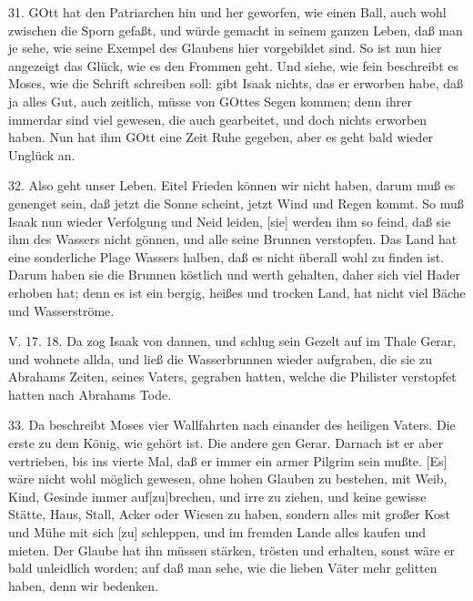 31. GOtt hat den Patriarchen hin und her geworfen, wie einen Ball, auch wohl zwischen die Sporn gefaßt, und würde gemacht in seinem ganzen Leben, daß man je sehe, wie seine Exempel des Glaubens hier vorgebildet sind. So ist nun hier angezeigt das Glück, wie es den Frommen geht. Und siehe, wie fein beschreibt es Moses, wie die Schrift schreiben soll: gibt Isaak nichts, das er erworben habe, daß ja alles Gut, auch zeitlich, müsse von GOttes Segen kommen; denn ihrer immerdar sind viel gewesen, die auch gearbeitet, und doch nichts erworben haben. Nun hat ihm GOtt eine Zeit Ruhe gegeben, aber es geht bald wieder Unglück an.

32. Also geht unser Leben. Eitel Frieden können wir nicht haben, darum muß es genenget sein, daß jetzt die Sonne scheint, jetzt Wind und Regen kommt. So muß Isaak nun wieder Verfolgung und Neid leiden, [sie] werden ihm so feind, daß sie ihm des Wassers nicht gönnen, und alle seine Brunnen verstopfen. Das Land
hat eine sonderliche Plage Wassers halben, daß es nicht überall wohl zu finden ist. Darum haben sie die Brunnen köstlich und werth gehalten, daher sich viel Hader erhoben hat; denn es ist ein bergig, heißes und trocken Land, hat nicht viel Bäche und Wasserströme.

\begin{schriftzitat}
V. 17. 18. Da zog Isaak von dannen, und schlug sein Gezelt auf im Thale Gerar, und wohnete allda, und ließ die Wasserbrunnen wieder aufgraben, die sie zu Abrahams Zeiten, seines Vaters, gegraben hatten, welche die Philister verstopfet hatten nach Abrahams Tode.
\end{schriftzitat}

33. Da beschreibt Moses vier Wallfahrten nach einander des heiligen Vaters. Die erste zu dem König, wie gehört ist. Die andere gen Gerar. Darnach ist er aber vertrieben, bis ins vierte Mal, daß er immer ein armer Pilgrim sein mußte. [Es] wäre nicht wohl möglich gewesen, ohne hohen Glauben zu bestehen, mit Weib, Kind, Gesinde immer auf[zu]brechen, und irre zu ziehen, und keine gewisse Stätte, Haus, Stall, Acker oder Wiesen zu haben, sondern alles mit großer Kost und Mühe mit sich [zu] schleppen, und im fremden Lande alles kaufen und mieten. Der Glaube hat ihn müssen stärken, trösten und erhalten, sonst wäre er bald unleidlich worden; auf daß man sehe, wie die lieben Väter mehr gelitten haben, denn wir bedenken.

